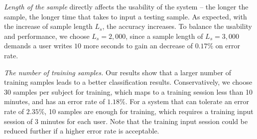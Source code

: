 




%

%
\textit{Length of the sample} directly affects the usability of the system -- the longer the sample, the longer time that takes to input a testing sample. As expected, with the increase of sample length $L_s$, the accuracy increases. To balance the usability and performance, we choose $L_s = 2,000$, since a sample length of $L_s = 3,000$ demands a user writes $10$ more seconds to gain an decrease of $0.17\%$ on error rate. %

 \textit{The number of training samples.} Our results show that a larger number of training samples leads to a better classification results. Conservatively, we choose 30 samples per subject for training, which maps to a training session less than 10 minutes, and has an error rate of $1.18\%$. For a system that can tolerate an error rate of $2.35\%$, 10 samples are enough for training, which requires a training input session of $3$ minutes for each user. Note that the training input session could be reduced further if a higher error rate is acceptable. 

